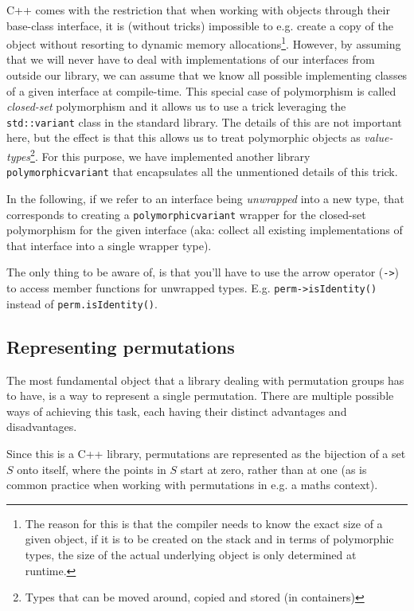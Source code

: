 \documentclass[parskip=half]{scrartcl}
\newcommand{\code}[1]{\texttt{#1}}
\newcommand{\class}[1]{\code{#1}}
\begin{document}
	C++ comes with the restriction that when working with objects through their base-class interface, it is (without tricks) impossible to e.g. create
	a copy of the object without resorting to dynamic memory allocations\footnote{The reason for this is that the compiler needs to know the exact
	size of a given object, if it is to be created on the stack and in terms of polymorphic types, the size of the actual underlying object is only
	determined at runtime.}. However, by assuming that we will never have to deal with implementations of our interfaces from outside our library, we
	can assume that we know all possible implementing classes of a given interface at compile-time. This special case of polymorphism is called
	\emph{closed-set} polymorphism and it allows us to use a trick leveraging the \class{std::variant} class in the standard library. The details of
	this are not important here, but the effect is that this allows us to treat polymorphic objects as \emph{value-types}\footnote{Types that can be
	moved around, copied and stored (in containers)}. For this purpose, we have implemented another library
	\code{polymorphic\textunderscore{}variant}\supercite{polymorphic_variant} that encapsulates all the unmentioned details of this trick.

	In the following, if we refer to an interface being \emph{unwrapped} into a new type, that corresponds to creating a
	\code{polymorphic\textunderscore{}variant} wrapper for the closed-set polymorphism for the given interface (aka: collect all existing
	implementations of that interface into a single wrapper type).

	The only thing to be aware of, is that you'll have to use the arrow operator (\code{->}) to access member functions for unwrapped types. E.g.
	\code{perm->isIdentity()} instead of \code{perm.isIdentity()}.


	\subsection{Representing permutations}

	The most fundamental object that a library dealing with permutation groups has to have, is a way to represent a single permutation. There are
	multiple possible ways of achieving this task, each having their distinct advantages and disadvantages. 

	Since this is a C++ library, permutations are represented as the bijection of a set $S$ onto itself, where the points in $S$ start at zero,
	rather than at one (as is common practice when working with permutations in e.g. a maths context).
\end{document}
